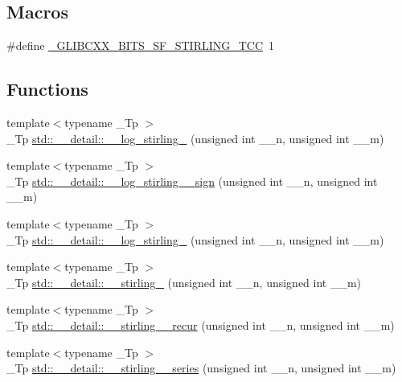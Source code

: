 \subsection*{Macros}
\begin{DoxyCompactItemize}
\item 
\#define \hyperlink{sf__stirling_8tcc_aa674f8ec509063cf88851a6ee6e72bc5}{\+\_\+\+G\+L\+I\+B\+C\+X\+X\+\_\+\+B\+I\+T\+S\+\_\+\+S\+F\+\_\+\+S\+T\+I\+R\+L\+I\+N\+G\+\_\+\+T\+CC}~1
\end{DoxyCompactItemize}
\subsection*{Functions}
\begin{DoxyCompactItemize}
\item 
{\footnotesize template$<$typename \+\_\+\+Tp $>$ }\\\+\_\+\+Tp \hyperlink{namespacestd_1_1____detail_a4924c5c0666c33328d6276b5dbbdfad5}{std\+::\+\_\+\+\_\+detail\+::\+\_\+\+\_\+log\+\_\+stirling\+\_} (unsigned int \+\_\+\+\_\+n, unsigned int \+\_\+\+\_\+m)
\item 
{\footnotesize template$<$typename \+\_\+\+Tp $>$ }\\\+\_\+\+Tp \hyperlink{namespacestd_1_1____detail_af804ed0eecfca835d1338a48892460b0}{std\+::\+\_\+\+\_\+detail\+::\+\_\+\+\_\+log\+\_\+stirling\+\_\+\_\+sign} (unsigned int \+\_\+\+\_\+n, unsigned int \+\_\+\+\_\+m)
\item 
{\footnotesize template$<$typename \+\_\+\+Tp $>$ }\\\+\_\+\+Tp \hyperlink{namespacestd_1_1____detail_a7ba1fde0547236676d579b6405f2fb25}{std\+::\+\_\+\+\_\+detail\+::\+\_\+\+\_\+log\+\_\+stirling\+\_} (unsigned int \+\_\+\+\_\+n, unsigned int \+\_\+\+\_\+m)
\item 
{\footnotesize template$<$typename \+\_\+\+Tp $>$ }\\\+\_\+\+Tp \hyperlink{namespacestd_1_1____detail_a8b215e4ca28ec9b7b078d7f3d9aecc17}{std\+::\+\_\+\+\_\+detail\+::\+\_\+\+\_\+stirling\+\_} (unsigned int \+\_\+\+\_\+n, unsigned int \+\_\+\+\_\+m)
\item 
{\footnotesize template$<$typename \+\_\+\+Tp $>$ }\\\+\_\+\+Tp \hyperlink{namespacestd_1_1____detail_a0a47b5d34956a55f438f2ba079680acd}{std\+::\+\_\+\+\_\+detail\+::\+\_\+\+\_\+stirling\+\_\+\_\+recur} (unsigned int \+\_\+\+\_\+n, unsigned int \+\_\+\+\_\+m)
\item 
{\footnotesize template$<$typename \+\_\+\+Tp $>$ }\\\+\_\+\+Tp \hyperlink{namespacestd_1_1____detail_adb65db9b399228c604c5f72156695965}{std\+::\+\_\+\+\_\+detail\+::\+\_\+\+\_\+stirling\+\_\+\_\+series} (unsigned int \+\_\+\+\_\+n, unsigned int \+\_\+\+\_\+m)

\end{DoxyCompactItemize}
